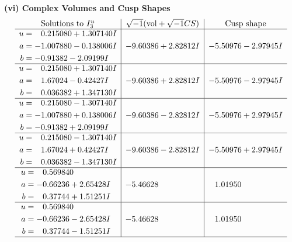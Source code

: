 \documentclass[1p]{elsarticle_modified}
\theoremstyle{definition}
\newcommand{\I}{\sqrt{-1}}
\begin{document}
\newpage\flushleft \textbf{(vi) Complex Volumes and Cusp Shapes}
$$\begin{array}{c|c|c}  
\text{Solutions to }I^u_{3}& \I (\text{vol} + \sqrt{-1}CS) & \text{Cusp shape}\\
 \hline 
\begin{aligned}
u &= \phantom{-}0.215080 + 1.307140 I \\
a &= -1.007880 - 0.138006 I \\
b &= -0.91382 - 2.09199 I\end{aligned}
 & -9.60386 + 2.82812 I & -5.50976 - 2.97945 I \\ \hline\begin{aligned}
u &= \phantom{-}0.215080 + 1.307140 I \\
a &= \phantom{-}1.67024 - 0.42427 I \\
b &= \phantom{-}0.036382 + 1.347130 I\end{aligned}
 & -9.60386 + 2.82812 I & -5.50976 - 2.97945 I \\ \hline\begin{aligned}
u &= \phantom{-}0.215080 - 1.307140 I \\
a &= -1.007880 + 0.138006 I \\
b &= -0.91382 + 2.09199 I\end{aligned}
 & -9.60386 - 2.82812 I & -5.50976 + 2.97945 I \\ \hline\begin{aligned}
u &= \phantom{-}0.215080 - 1.307140 I \\
a &= \phantom{-}1.67024 + 0.42427 I \\
b &= \phantom{-}0.036382 - 1.347130 I\end{aligned}
 & -9.60386 - 2.82812 I & -5.50976 + 2.97945 I \\ \hline\begin{aligned}
u &= \phantom{-}0.569840\phantom{ +0.000000I} \\
a &= -0.66236 + 2.65428 I \\
b &= \phantom{-}0.37744 + 1.51251 I\end{aligned}
 & -5.46628\phantom{ +0.000000I} & \phantom{-}1.01950\phantom{ +0.000000I} \\ \hline\begin{aligned}
u &= \phantom{-}0.569840\phantom{ +0.000000I} \\
a &= -0.66236 - 2.65428 I \\
b &= \phantom{-}0.37744 - 1.51251 I\end{aligned}
 & -5.46628\phantom{ +0.000000I} & \phantom{-}1.01950\phantom{ +0.000000I}\\
 \hline 
 \end{array}$$\newpage
\end{document}
